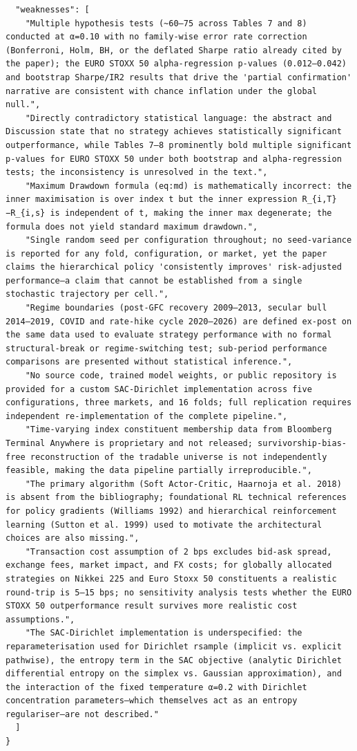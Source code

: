 \documentclass[11pt]{article}
\begin{document}
\begin{verbatim}
  "weaknesses": [
    "Multiple hypothesis tests (~60–75 across Tables 7 and 8) conducted at α=0.10 with no family-wise error rate correction (Bonferroni, Holm, BH, or the deflated Sharpe ratio already cited by the paper); the EURO STOXX 50 alpha-regression p-values (0.012–0.042) and bootstrap Sharpe/IR2 results that drive the 'partial confirmation' narrative are consistent with chance inflation under the global null.",
    "Directly contradictory statistical language: the abstract and Discussion state that no strategy achieves statistically significant outperformance, while Tables 7–8 prominently bold multiple significant p-values for EURO STOXX 50 under both bootstrap and alpha-regression tests; the inconsistency is unresolved in the text.",
    "Maximum Drawdown formula (eq:md) is mathematically incorrect: the inner maximisation is over index t but the inner expression R_{i,T}−R_{i,s} is independent of t, making the inner max degenerate; the formula does not yield standard maximum drawdown.",
    "Single random seed per configuration throughout; no seed-variance is reported for any fold, configuration, or market, yet the paper claims the hierarchical policy 'consistently improves' risk-adjusted performance—a claim that cannot be established from a single stochastic trajectory per cell.",
    "Regime boundaries (post-GFC recovery 2009–2013, secular bull 2014–2019, COVID and rate-hike cycle 2020–2026) are defined ex-post on the same data used to evaluate strategy performance with no formal structural-break or regime-switching test; sub-period performance comparisons are presented without statistical inference.",
    "No source code, trained model weights, or public repository is provided for a custom SAC-Dirichlet implementation across five configurations, three markets, and 16 folds; full replication requires independent re-implementation of the complete pipeline.",
    "Time-varying index constituent membership data from Bloomberg Terminal Anywhere is proprietary and not released; survivorship-bias-free reconstruction of the tradable universe is not independently feasible, making the data pipeline partially irreproducible.",
    "The primary algorithm (Soft Actor-Critic, Haarnoja et al. 2018) is absent from the bibliography; foundational RL technical references for policy gradients (Williams 1992) and hierarchical reinforcement learning (Sutton et al. 1999) used to motivate the architectural choices are also missing.",
    "Transaction cost assumption of 2 bps excludes bid-ask spread, exchange fees, market impact, and FX costs; for globally allocated strategies on Nikkei 225 and Euro Stoxx 50 constituents a realistic round-trip is 5–15 bps; no sensitivity analysis tests whether the EURO STOXX 50 outperformance result survives more realistic cost assumptions.",
    "The SAC-Dirichlet implementation is underspecified: the reparameterisation used for Dirichlet rsample (implicit vs. explicit pathwise), the entropy term in the SAC objective (analytic Dirichlet differential entropy on the simplex vs. Gaussian approximation), and the interaction of the fixed temperature α=0.2 with Dirichlet concentration parameters—which themselves act as an entropy regulariser—are not described."
  ]
}
\end{verbatim}
\end{document}
